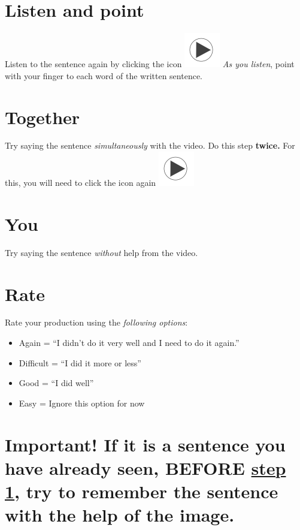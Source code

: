 \documentclass[
]{book}
\begin{document}
\hypertarget{listen-and-point}{%
\section{Listen and point}\label{listen-and-point}}

Listen to the sentence again by clicking the icon \includegraphics{images/play_icon.png} \emph{As you listen}, point with your finger to each word of the written sentence.

\hypertarget{together}{%
\section{Together}\label{together}}

Try saying the sentence \emph{simultaneously } with the video. Do this step \textbf{twice.} For this, you will need to click the icon again \includegraphics{images/play_icon.png}

\hypertarget{you}{%
\section{You}\label{you}}

Try saying the sentence \emph{without} help from the video.

\hypertarget{rate}{%
\section{Rate}\label{rate}}

Rate your production using the \emph{following options}:

\begin{itemize}
\item
  Again = ``I didn't do it very well and I need to do it again.''
\item
  Difficult = ``I did it more or less''
\item
  Good = ``I did well''
\item
  Easy = Ignore this option for now
\end{itemize}

\hypertarget{important-if-it-is-a-sentence-you-have-already-seen-before-step-1-try-to-remember-the-sentence-with-the-help-of-the-image.}{%
\section{\texorpdfstring{Important! If it is a sentence you have \textbf{already} seen, BEFORE \protect\hyperlink{cross_6}{step 1}, try to remember the sentence with the help of the image.}{Important! If it is a sentence you have already seen, BEFORE step 1, try to remember the sentence with the help of the image.}}\label{important-if-it-is-a-sentence-you-have-already-seen-before-step-1-try-to-remember-the-sentence-with-the-help-of-the-image.}}
\end{document}
